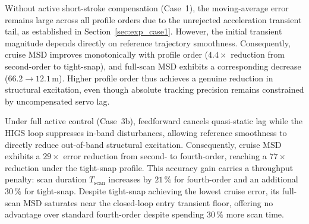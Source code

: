 Without active short-stroke compensation (Case~1), the moving-average error remains large across all profile orders due to the unrejected acceleration transient tail, as established in Section~\ref{sec:exp_case1}. However, the initial transient magnitude depends directly on reference trajectory smoothness. Consequently, cruise $\mathrm{MSD}$ improves monotonically with profile order ($4.4\times$ reduction from second-order to tight-snap), and full-scan $\mathrm{MSD}$ exhibits a corresponding decrease ($66.2 \rightarrow 12.1$\,\textmu m). Higher profile order thus achieves a genuine reduction in structural excitation, even though absolute tracking precision remains constrained by uncompensated servo lag.

Under full active control (Case~3b), feedforward cancels quasi-static lag while the HIGS loop suppresses in-band disturbances, allowing reference smoothness to directly reduce out-of-band structural excitation. Consequently, cruise $\mathrm{MSD}$ exhibits a $29\times$ error reduction from second- to fourth-order, reaching a $77\times$ reduction under the tight-snap profile. This accuracy gain carries a throughput penalty: scan duration $T_{\mathrm{scan}}$ increases by $21\,\%$ for fourth-order and an additional $30\,\%$ for tight-snap. Despite tight-snap achieving the lowest cruise error, its full-scan $\mathrm{MSD}$ saturates near the closed-loop entry transient floor, offering no advantage over standard fourth-order despite spending $30\,\%$ more scan time.
